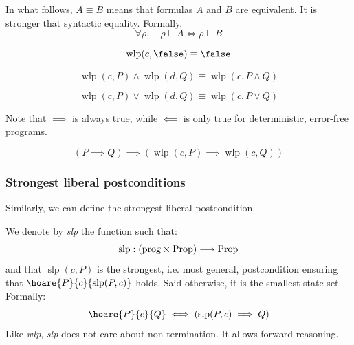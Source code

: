 \documentclass[toc]{../cs-classes/cs-classes}
\DeclareMathOperator{\wlp}{wlp}
\DeclareMathOperator{\slp}{slp}
\begin{document}
In what follows, $A\equiv B$ means that formulas $A$ and $B$ are equivalent. It is stronger that syntactic equality. Formally,
\begin{equation*}
    \forall\rho, \quad \rho \vDash A \iff \rho \vDash B
\end{equation*}

\begin{property}
    \begin{equation*}
        \wlp(c, \false) \equiv \false
    \end{equation*}
\end{property}

\begin{property}
    \begin{equation*}
        \wlp(c, P) \land \wlp(d, Q) \equiv \wlp(c, P\land Q)
    \end{equation*}
\end{property}

\begin{property}
    \begin{equation*}
        \wlp(c, P) \lor \wlp(d, Q) \equiv \wlp(c, P\lor Q)
    \end{equation*}

    \noindent Note that $\implies$ is always true, while $\impliedby$ is only true for deterministic, error-free programs.
\end{property}

\begin{property}[Monotonicity]
    \begin{equation*}
        (P\implies Q) \implies (\wlp(c, P) \implies \wlp(c, Q))
    \end{equation*}
\end{property}


\subsubsection{Strongest liberal postconditions}
Similarly, we can define the strongest liberal postcondition.
\begin{definition}
    We denote by \emph{slp} the function such that:
    \begin{equation*}
        \slp: (\textnormal{prog} \times \textnormal{Prop}) \longrightarrow \textnormal{Prop}
    \end{equation*}
    and that $\slp(c, P)$ is the strongest, i.e. most general, postcondition ensuring that $\hoare{P}{c}{\slp(P, c)}$ holds. Said otherwise, it is the smallest state set. Formally:
    \begin{equation*}
        \hoare{P}{c}{Q} \iff (\slp(P, c)\implies Q)
    \end{equation*}
    Like \emph{wlp}, \emph{slp} does not care about non-termination. It allows forward reasoning.
\end{definition}
\end{document}
